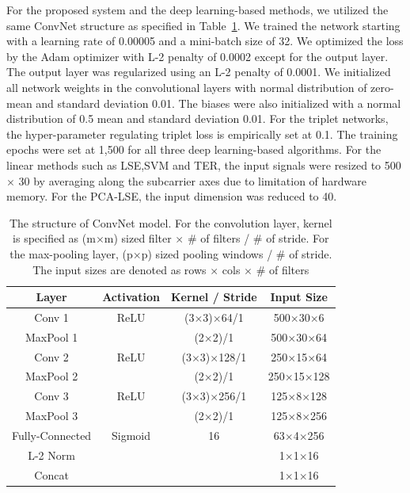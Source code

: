 \documentclass[sigconf]{acmart}
\begin{document}
For the proposed system and the deep learning-based methods, we utilized the same ConvNet structure as specified in Table~\ref{tab1}. We trained the network starting with a learning rate of 0.00005 and a mini-batch size of 32. We optimized the loss by the Adam optimizer with L-2 penalty of 0.0002 except for the output layer. The output layer was regularized using an L-2 penalty of 0.0001. We initialized all network weights in the convolutional layers with normal distribution of zero-mean and standard deviation 0.01. The biases were also initialized with a normal distribution of 0.5 mean and standard deviation 0.01. For the triplet networks, the hyper-parameter regulating triplet loss is empirically set at 0.1. The training epochs were set at 1,500 for all three deep learning-based algorithms. For the linear methods such as LSE,SVM and TER, the input signals were resized to 500 $\times$ 30 by averaging along the subcarrier axes due to limitation of hardware memory. For the PCA-LSE, the input dimension was reduced to 40.
\begin{table}
    \caption{The structure of ConvNet model. For the convolution layer, kernel is specified as (m$\times$m) sized filter $\times$ \# of filters / \# of stride. For the max-pooling layer, (p$\times$p) sized pooling windows / \# of stride. The input sizes are denoted as rows $\times$ cols $\times$ \# of filters}
    \label{tab1}
    \begin{tabular}{cccc}
     \toprule
     Layer     & Activation & Kernel / Stride & Input Size \\
     \midrule
     Conv 1    & ReLU       & (3$\times$3)$\times$64/1      & 500$\times$30$\times$6   \\
     MaxPool 1 &            & (2$\times$2)/1         & 500$\times$30$\times$64  \\
     Conv 2    & ReLU       & (3$\times$3)$\times$128/1     & 250$\times$15$\times$64 \\
     MaxPool 2 &            & (2$\times$2)/1         & 250$\times$15$\times$128 \\
     Conv 3    & ReLU       & (3$\times$3)$\times$256/1     & 125$\times$8$\times$128  \\
     MaxPool 3 &            & (2$\times$2)/1         & 125$\times$8$\times$256  \\
     Fully-Connected     & Sigmoid    & 16             & 63$\times$4$\times$256   \\
     L-2 Norm  &            &                 & 1$\times$1$\times$16    \\
     Concat    &            &                 & 1$\times$1$\times$16    \\
     \bottomrule
    \end{tabular}
\end{table}
\end{document}
